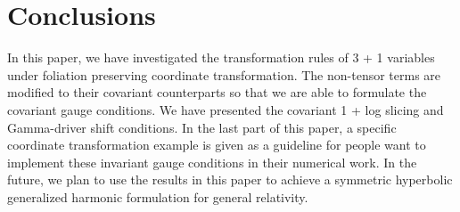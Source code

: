 \documentclass[letterpaper,nofootinbib,prd,amsmath,onecolumn]{revtex4-1}
\begin{document}
\section{Conclusions}
In this paper, we have investigated the transformation rules of 3 + 1 variables under foliation preserving coordinate transformation. The non-tensor terms are modified to their covariant counterparts so that we are able to formulate the covariant gauge conditions. We have presented the covariant 1 + log slicing and Gamma-driver shift conditions. In the last part of this paper, a specific coordinate transformation example is given as a guideline for people want to implement these invariant gauge conditions in their numerical work. In the future, we plan to use the results in this paper to achieve a symmetric hyperbolic generalized harmonic formulation for general relativity.  



\end{document}
